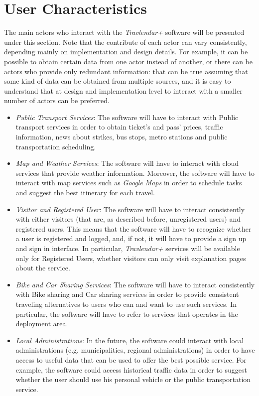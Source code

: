 \section{User Characteristics}
The main actors who interact with the \emph{Travlendar+} software will be presented under this section. Note that the contribute of each actor can vary consistently, depending mainly on implementation and design details. For example, it can be possible to obtain certain data from one actor instead of another, or there can be actors who provide only redundant information: that can be true assuming that some kind of data can be obtained from multiple sources, and it is easy to understand that at design and implementation level to interact with a smaller number of actors can be preferred.
\begin{itemize}

	\item \emph{Public Transport Services}: The software will have to interact with Public transport services in order to obtain ticket's and pass' prices, traffic information, news about strikes, bus stops, metro stations and public transportation scheduling.
    
    \item \emph{Map and Weather Services}: The software will have to interact with cloud services that provide weather information. Moreover, the software will have to interact with map services such as \emph{Google Maps} in order to schedule tasks and suggest the best itinerary for each travel.
    
    \item \emph{Visitor and Registered User}: The software will have to interact consistently with either visitors (that are, as described before, unregistered users) and registered users. This means that the software will have to recognize whether a user is registered and logged, and, if not, it will have to provide a sign up and sign in interface. In particular, \emph{Travlendar+} services will be available only for Registered Users, whether visitors can only visit explanation pages about the service.
    
    \item \emph{Bike and Car Sharing Services}: The software will have to interact consistently with Bike sharing and Car sharing services in order to provide consistent traveling alternatives to users who can and want to use such services. In particular, the software will have to refer to services that operates in the deployment area. 
    
    \item \emph{Local Administrations}: In the future, the software could interact with local administrations (e.g. municipalities, regional administrations) in order to have access to useful data that can be used to offer the best possible service. For example, the software could access historical traffic data in order to suggest whether the user should use his personal vehicle or the public transportation service.  

\end{itemize}